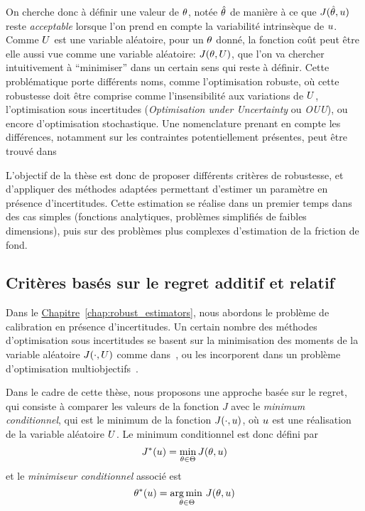 \documentclass[../../Main_ManuscritThese.tex]{subfiles}
\newcommand{\frchap}[1]{\hyperref[#1]{Chapitre}~\ref{#1}}
\begin{document}
On cherche donc à définir une valeur de $\theta$, notée $\hat{\theta}$ de
manière à ce que $J(\hat{\theta}, u)$ reste \emph{acceptable} lorsque
l'on prend en compte la variabilité intrinsèque de $u$. Comme $U$
est une variable aléatoire, pour un $\theta$ donné, la fonction coût peut
être elle aussi vue comme une variable aléatoire: $J(\theta,U)$, que
l'on va chercher intuitivement à ``minimiser'' dans un certain sens
qui reste à définir.  Cette problématique porte différents noms, comme
l'optimisation robuste, où cette robustesse doit être comprise comme
l'insensibilité aux variations de $U$, l'optimisation sous
incertitudes (\emph{Optimisation under Uncertainty} ou \emph{OUU}), ou
encore d'optimisation stochastique. Une nomenclature prenant en compte
les différences, notamment sur les contraintes potentiellement
présentes, peut être trouvé dans~\cite{lelievre_consideration_2016}


L'objectif de la thèse est donc de proposer différents critères de
robustesse, et d'appliquer des méthodes adaptées permettant d'estimer
un paramètre en présence d'incertitudes. Cette estimation se réalise
dans un premier temps dans des cas simples (fonctions analytiques,
problèmes simplifiés de faibles dimensions), puis sur des problèmes
plus complexes d'estimation de la friction de fond.

\subsection*{Critères basés sur le regret additif et relatif}
Dans le \frchap{chap:robust_estimators}, nous abordons le problème de
calibration en présence d'incertitudes. Un certain nombre des méthodes
d'optimisation sous incertitudes se basent sur la minimisation des
moments de la variable aléatoire $J(\mathbf{\cdot}, U)$ comme
dans~\cite{lehman_designing_2004,janusevskis_simultaneous_2010}, ou
les incorporent dans un problème d'optimisation
multiobjectifs~\cite{baudoui_optimisation_2012,ribaud_krigeage_2018}.

Dans le cadre de cette thèse, nous proposons une approche basée sur le
regret, qui consiste à comparer les valeurs de la fonction $J$ avec le
\emph{minimum conditionnel}, qui est le minimum de la fonction
$J(\cdot, u)$, où $u$ est une réalisation de la variable aléatoire
$U$. Le minimum conditionnel est donc défini par
\begin{equation*}
  \label{eq:Jstar}
  J^*(u) = \min_{\theta\in\Theta} J(\theta,u)
\end{equation*}
et le \emph{minimiseur conditionnel} associé est
\begin{equation*}
  \label{eq:Kstar}
  \theta^*(u) = \operatorname*{arg\,min \,}_{\theta\in \Theta}J(\theta,u)
\end{equation*}
\end{document}
